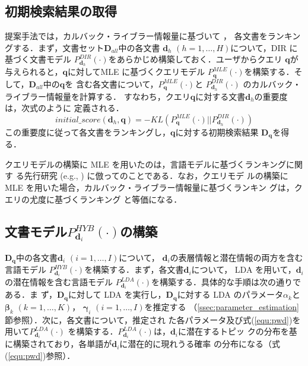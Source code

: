 \documentclass[japanese]{jnlp_1.4}
\begin{document}
\subsection{初期検索結果の取得} \label{ssec:initial_resuls_acquisition}

提案手法では，カルバック・ライブラー情報量に基づいて \cite{Lafferty2001}，
各文書をランキングする．まず，文書セット$\bm{D}_{all}$中の各文書
$\bm{d}_{h}$ $(h = 1, \dots, H)$について，DIR に基づく文書モデル
$P^{DIR}_{\bm{d}_{h}}(\cdot)$をあらかじめ構築しておく．ユーザからクエリ
$\bm{q}$が与えられると，$\bm{q}$に対してMLE に基づくクエリモデル
$P^{MLE}_{\bm{q}}(\cdot)$を構築する．そして，$\bm{D}_{all}$中の$\bm{q}$を
含む各文書について，$P^{MLE}_{\bm{q}}(\cdot)$と
$P^{DIR}_{\bm{d}_{h}}(\cdot)$ のカルバック・ライブラー情報量を計算する．
すなわち，クエリ$\bm{q}$に対する文書$\bm{d}_{h}$の重要度は，次式のように
定義される．
\begin{equation}
 initial\_score(\bm{d}_{h},\bm{q})
 =
 - KL(P^{MLE}_{\bm{q}}(\cdot)||P^{DIR}_{\bm{d}_{h}}(\cdot))
 \label{equ:initial_score}
\end{equation}
この重要度に従って各文書をランキングし，$\bm{q}$に対する初期検索結果
$\bm{D_{q}}$を得る．

クエリモデルの構築に MLE を用いたのは，言語モデルに基づくランキングに関す
る先行研究 (e.g., \cite{Zhai2001}) に倣ってのことである．なお，クエリモデ
ルの構築に MLE を用いた場合，カルバック・ライブラー情報量に基づくランキン
グは，クエリの尤度に基づくランキング \cite{Ponte1998}と等価になる．



\subsection{文書モデル$P^{HYB}_{\bm{d}_{i}}(\cdot)$の構築}
\label{ssec:hdm_construction}

$\bm{D}_{\bm{q}}$中の各文書$\bm{d}_{i}$ $(i = 1, \dots, I)$について，
$\bm{d}_{i}$の表層情報と潜在情報の両方を含む言語モデル
$P^{HYB}_{\bm{d}_{i}}(\cdot)$を構築する．まず，各文書$\bm{d}_{i}$について，
LDA を用いて，$\bm{d}_{i}$の潜在情報を含む言語モデル
$P^{LDA}_{\bm{d}_{i}}(\cdot)$を構築する．具体的な手順は次の通りである．ま
ず，$\bm{D}_{\bm{q}}$に対して LDA を実行し，$\bm{D}_{\bm{q}}$に対する
LDA のパラメータ$\alpha_{k}$と$\bm{\beta}_{k}$ $(k = 1, \dots, K)$，
$\bm{\gamma}_{i}$ $(i = 1, \dots, I)$を推定する
（\ref{ssec:parameter_estimation}節参照）．次に，各文書について，推定され
た各パラメータ及び式(\ref{equ:pwd})を用いて$P^{LDA}_{\bm{d}_{i}}(\cdot)$
を構築する．$P^{LDA}_{\bm{d}_{i}}(\cdot)$は，$\bm{d}_{i}$に潜在するトピッ
クの分布を基に構築されており，各単語が$\bm{d}_{i}$に潜在的に現れうる確率
の分布になる（式(\ref{equ:pwd})参照）．
\end{document}
